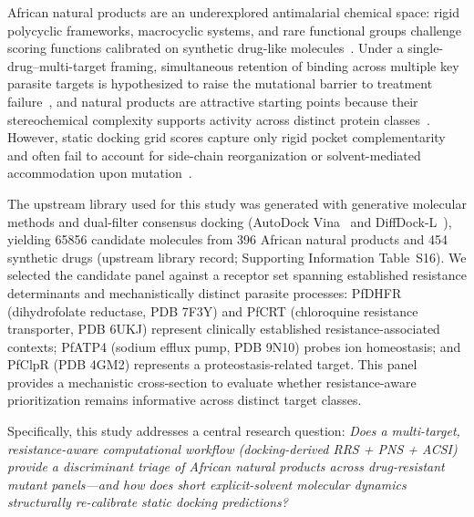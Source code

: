 \documentclass[journal=jcisd8,manuscript=article,layout=traditional]{achemso}
\begin{document}
African natural products are an underexplored antimalarial chemical space: rigid polycyclic frameworks, macrocyclic systems, and rare functional groups challenge scoring functions calibrated on synthetic drug-like molecules~\citep{ferreira2023docking}. Under a single-drug--multi-target framing, simultaneous retention of binding across multiple key parasite targets is hypothesized to raise the mutational barrier to treatment failure~\citep{polypharmacology_malaria_2026}, and natural products are attractive starting points because their stereochemical complexity supports activity across distinct protein classes~\citep{polypharmacology_malaria_2026,value_addition_african_np_2025}. However, static docking grid scores capture only rigid pocket complementarity and often fail to account for side-chain reorganization or solvent-mediated accommodation upon mutation~\citep{ferreira2023docking,soares2023mdreport}.

The upstream library used for this study was generated with generative molecular methods and dual-filter consensus docking (AutoDock Vina~\citep{vina_2021} and DiffDock-L~\citep{diffdock_2023}), yielding \num{65856} candidate molecules from 396 African natural products and 454 synthetic drugs (upstream library record; Supporting Information Table~S16). We selected the candidate panel against a receptor set spanning established resistance determinants and mechanistically distinct parasite processes: PfDHFR (dihydrofolate reductase, PDB 7F3Y) and PfCRT (chloroquine resistance transporter, PDB 6UKJ) represent clinically established resistance-associated contexts; PfATP4 (sodium efflux pump, PDB 9N10) probes ion homeostasis; and PfClpR (PDB 4GM2) represents a proteostasis-related target. This panel provides a mechanistic cross-section to evaluate whether resistance-aware prioritization remains informative across distinct target classes.

Specifically, this study addresses a central research question: \textit{Does a multi-target, resistance-aware computational workflow (docking-derived RRS + PNS + ACSI) provide a discriminant triage of African natural products across drug-resistant mutant panels---and how does short explicit-solvent molecular dynamics structurally re-calibrate static docking predictions?}
\end{document}
